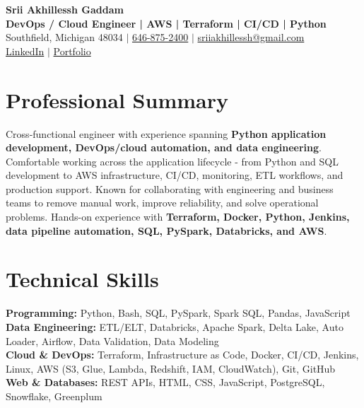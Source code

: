 \documentclass[letterpaper,10pt]{article}
\begin{document}
\fontsize{9.35pt}{10.45pt}\selectfont

\begin{center}
    {\LARGE \textbf{Srii Akhillessh Gaddam}} \\[-1pt]
    \textbf{DevOps / Cloud Engineer | AWS | Terraform | CI/CD | Python} \\[2pt]
    Southfield, Michigan 48034 $|$
    \href{tel:6468752400}{646-875-2400} $|$
    \href{mailto:sriiakhillessh@gmail.com}{sriiakhillessh@gmail.com} \\[1pt]
    \href{https://www.linkedin.com/in/srii-akhiilessh-gaddam-b48668191/}{LinkedIn} $|$
    \href{https://sriiakhillesshg.github.io/portfolio/}{Portfolio}
\end{center}
\vspace{-8pt}

\section{Professional Summary}
\small{Cross-functional engineer with experience spanning \textbf{Python application development, DevOps/cloud automation, and data engineering}. Comfortable working across the application lifecycle - from Python and SQL development to AWS infrastructure, CI/CD, monitoring, ETL workflows, and production support. Known for collaborating with engineering and business teams to remove manual work, improve reliability, and solve operational problems. Hands-on experience with \textbf{Terraform, Docker, Python, Jenkins, data pipeline automation, SQL, PySpark, Databricks, and AWS}.}

\section{Technical Skills}
\small{
\textbf{Programming:} Python, Bash, SQL, PySpark, Spark SQL, Pandas, JavaScript \\
\textbf{Data Engineering:} ETL/ELT, Databricks, Apache Spark, Delta Lake, Auto Loader, Airflow, Data Validation, Data Modeling \\
\textbf{Cloud \& DevOps:} Terraform, Infrastructure as Code, Docker, CI/CD, Jenkins, Linux, AWS (S3, Glue, Lambda, Redshift, IAM, CloudWatch), Git, GitHub \\
\textbf{Web \& Databases:} REST APIs, HTML, CSS, JavaScript, PostgreSQL, Snowflake, Greenplum
}
\end{document}
